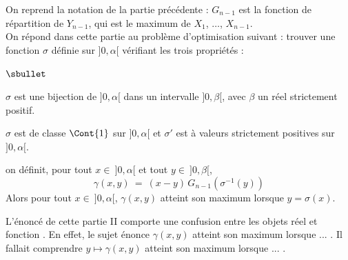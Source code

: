\documentclass[11pt]{article}%
\begin{document}
\noindent
On reprend la notation de la partie précédente : $G_{n-1}$ est la
fonction de répartition de $Y_{n-1}$, qui est le maximum de $X_1$, 
$\ldots$, $X_{n-1}$.\\
On répond dans cette partie au problème d'optimisation suivant : 
trouver une fonction $\sigma$ définie sur $]0,\alpha[$ vérifiant les 
trois propriétés :
\begin{noliste}{$\sbullet$}
  \item $\sigma$ est une bijection de $]0,\alpha[$ dans un intervalle 
  $]0,\beta[$, avec $\beta$ un réel strictement positif.
  \item $\sigma$ est de classe $\Cont{1}$ sur $]0,\alpha[$ et 
  $\sigma'$ est à valeurs strictement positives sur $]0,\alpha[$.
  \item on définit, pour tout $x \in \ ]0,\alpha[$ et tout $y \in 
  \ ]0, \beta[$,
  \[
    \gamma(x,y) \ = \ (x-y) \, G_{n-1}(\sigma^{-1}(y))
  \]
  Alors pour tout $x \in \ ]0,\alpha[$, $\gamma(x,y)$ atteint son 
  maximum lorsque $y = \sigma(x)$.
\end{noliste}

\begin{remark}
  L'énoncé de cette partie II comporte une confusion entre les 
  objets \og réel \fg{} et \og fonction \fg{}. En effet, le sujet 
  énonce \og $\gamma(x,y)$ atteint son maximum lorsque ... \fg{}.
  Il fallait comprendre \og $y \mapsto \gamma(x,y)$ atteint son 
  maximum lorsque ... \fg{}.
\end{remark}
\end{document}
